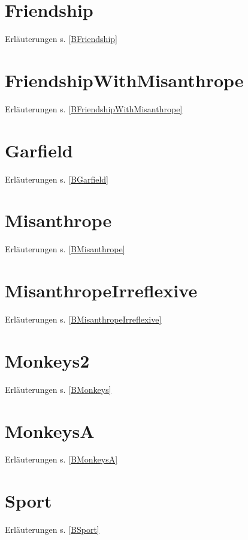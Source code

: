 \documentclass[a4paper, 11pt]{book}
\begin{document}
{\newpage


\section{Friendship} Erläuterungen s. \ref{BFriendship}
\label{Friendship}

\newpage

\section{FriendshipWithMisanthrope} Erläuterungen s. \ref{BFriendshipWithMisanthrope}
\label{FriendshipWithMisanthrope}

\newpage

\section{Garfield}  Erläuterungen s. \ref{BGarfield}
\label{Garfield}


\newpage

\section{Misanthrope} Erläuterungen s. \ref{BMisanthrope}
\label{Misanthrope}

\newpage



\section{MisanthropeIrreflexive} Erläuterungen s. \ref{BMisanthropeIrreflexive}
\label{MisanthropeIrreflexive}

\newpage

\section{Monkeys2} Erläuterungen s. \ref{BMonkeys}
\label{Monkeys2}


\newpage

\section{MonkeysA} Erläuterungen s. \ref{BMonkeysA}
\label{MonkeysA}


\newpage

\section{Sport} Erläuterungen s. \ref{BSport}
\label{Sport}

\newpage

}
\end{document}
